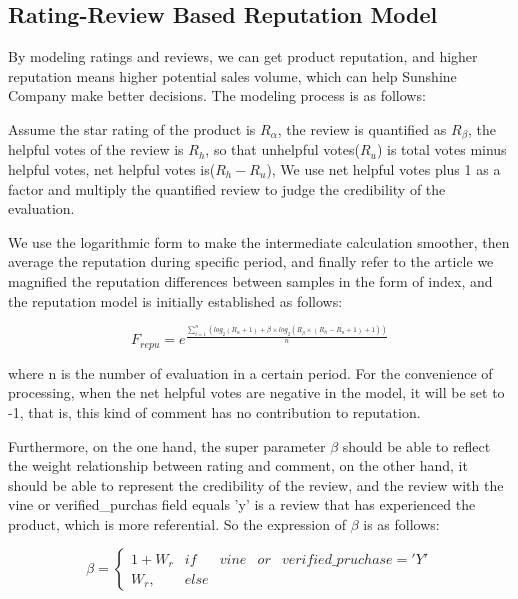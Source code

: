 \documentclass{mcmthesis}
\begin{document}
\subsection{Rating-Review Based Reputation Model}
\label{task_b}
By modeling ratings and reviews, we can get product reputation, and higher reputation means higher potential sales volume, which can help Sunshine Company make better decisions. The modeling process is as follows:

Assume the star rating of the product is $R_{\alpha}$, the review is quantified as $R_{\beta}$, the helpful votes of the review is $R_{h}$, so that unhelpful votes($R_{u}$) is total votes minus helpful votes, net helpful votes is($R_{h}-R_{u}$), We use net helpful votes plus 1 as a factor and multiply the quantified review to judge the credibility of the evaluation.

We use the logarithmic form to make the intermediate calculation smoother, then average the reputation during specific period, and finally refer to the article\cite{subkhankulova2006comparative} we magnified the reputation differences between samples in the form of index, and the reputation model is initially established as follows:

\begin{equation}
	F_{repu} =  e^{\frac{\sum_{i=1}^{n}(log_2(R_{\alpha}+1)+ \beta \times log_2(R_{\beta}\times(R_{h}-R_{u}+1)+1))}{n}}
	\label{priA}
\end{equation}

where n is the number of evaluation in a certain period. For the convenience of processing, when the net helpful votes are negative in the model, it will be set to -1, that is, this kind of comment has no contribution to reputation.

Furthermore, on the one hand, the super parameter $\beta$ should be able to reflect the weight relationship between rating and comment, on the other hand, it should be able to represent the credibility of the review, and the review with the vine or verified\_purchas field equals 'y' is a review that has experienced the product, which is more referential. So the expression of $\beta$ is as follows:

\begin{equation}
	\beta =\left\{\begin{matrix}
1+W_{r} & if &vine &or &verified\_pruchase = 'Y'\\ 
W_{r},& else
\end{matrix}\right.
\label{hyperbeta}
\end{equation}
\end{document}

